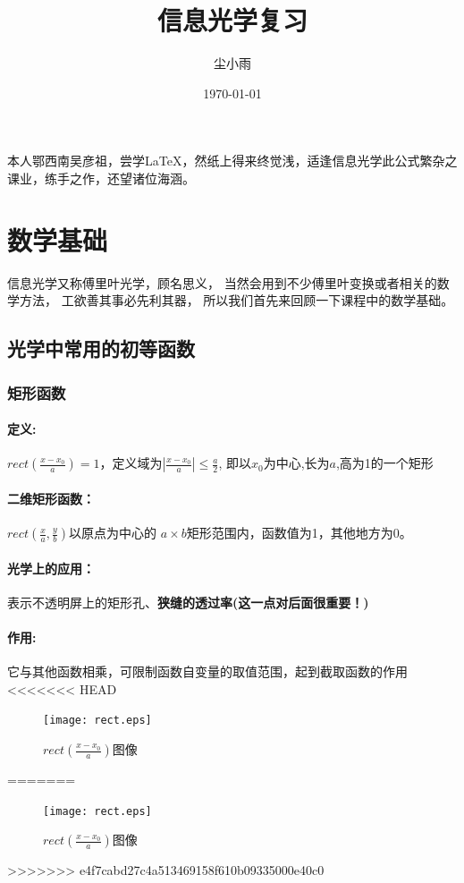 \documentclass[UTF8]{ctexart}
\title{信息光学复习}%
\author{尘小雨}%
\date{\today}
\newcommand{\rect}[1]{rect( \f{x-x_{0}}{#1})}%
\newcommand{\rectt}[2]{rect( \f{x}{#1},\f{y}{#2})}%
\newcommand{\f}[2]{\frac{#1}{#2}}%
\begin{document}
本人鄂西南吴彦祖，尝学\LaTeX，然纸上得来终觉浅，适逢信息光学此公式繁杂之课业，练手之作，还望诸位海涵。
\maketitle%
\tableofcontents   %
\section{数学基础}%
信息光学又称傅里叶光学，顾名思义，
当然会用到不少傅里叶变换或者相关的数学方法，
工欲善其事必先利其器，
所以我们首先来回顾一下课程中的数学基础。%
 \subsection{光学中常用的初等函数}%
  \subsubsection{矩形函数}%
    \paragraph{定义:}%
    $\rect{a}=1$，定义域为$\left\vert\f{x-x_{0}}{a}\right\vert\le\f{a}{2}$,%
即以$x_{0}$为中心,长为$a$,高为1的一个矩形
    \paragraph{二维矩形函数：}$\rectt{a}{b}$以原点为中心的
$a\times b$矩形范围内，函数值为1，其他地方为0。
    \paragraph{光学上的应用：}表示不透明屏上的矩形孔、\textbf{狭缝的透过率(这一点对后面很重要！)}%
    \paragraph{作用:}它与其他函数相乘，可限制函数自变量的取值范围，起到截取函数的作用
<<<<<<< HEAD
     \begin{figure}
      \centering
      \texttt{[image: rect.eps]}
      \caption{$\rect{a}$图像}
     \end{figure}%
=======
        \begin{figure}
        \centering
        \texttt{[image: rect.eps]}
        \caption{$\rect{a}$图像}
        \end{figure}%
>>>>>>> e4f7cabd27c4a513469158f610b09335000e40c0
\end{document}
